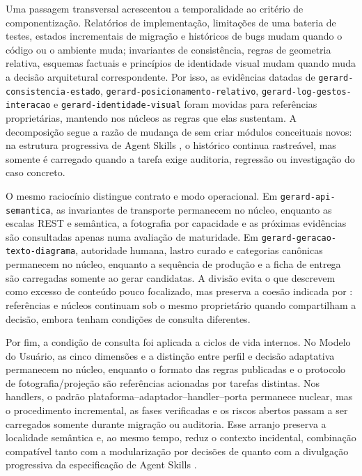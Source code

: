 \documentclass[preprint,12pt,authoryear]{elsarticle}
\begin{document}
Uma passagem transversal acrescentou a temporalidade ao critério de componentização. Relatórios de implementação, limitações de uma bateria de testes, estados incrementais de migração e históricos de bugs mudam quando o código ou o ambiente muda; invariantes de consistência, regras de geometria relativa, esquemas factuais e princípios de identidade visual mudam quando muda a decisão arquitetural correspondente. Por isso, as evidências datadas de \texttt{gerard-consistencia-estado}, \texttt{gerard-posicionamento-relativo}, \texttt{gerard-log-gestos-interacao} e \texttt{gerard-identidade-visual} foram movidas para referências proprietárias, mantendo nos núcleos as regras que elas sustentam. A decomposição segue a razão de mudança de \citet{parnas1972criteria} sem criar módulos conceituais novos: na estrutura progressiva de Agent Skills \citep{agentskills2026spec}, o histórico continua rastreável, mas somente é carregado quando a tarefa exige auditoria, regressão ou investigação do caso concreto.

O mesmo raciocínio distingue contrato e modo operacional. Em \texttt{gerard-api-semantica}, as invariantes de transporte permanecem no núcleo, enquanto as escalas REST e semântica, a fotografia por capacidade e as próximas evidências são consultadas apenas numa avaliação de maturidade. Em \texttt{gerard-geracao-texto-diagrama}, autoridade humana, lastro curado e categorias canônicas permanecem no núcleo, enquanto a sequência de produção e a ficha de entrega são carregadas somente ao gerar candidatas. A divisão evita o que \citet{hong2026smells} descrevem como excesso de conteúdo pouco focalizado, mas preserva a coesão indicada por \citet{parnas1972criteria}: referências e núcleos continuam sob o mesmo proprietário quando compartilham a decisão, embora tenham condições de consulta diferentes.

Por fim, a condição de consulta foi aplicada a ciclos de vida internos. No Modelo do Usuário, as cinco dimensões e a distinção entre perfil e decisão adaptativa permanecem no núcleo, enquanto o formato das regras publicadas e o protocolo de fotografia/projeção são referências acionadas por tarefas distintas. Nos handlers, o padrão plataforma--adaptador--handler--porta permanece nuclear, mas o procedimento incremental, as fases verificadas e os riscos abertos passam a ser carregados somente durante migração ou auditoria. Esse arranjo preserva a localidade semântica e, ao mesmo tempo, reduz o contexto incidental, combinação compatível tanto com a modularização por decisões de \citet{parnas1972criteria} quanto com a divulgação progressiva da especificação de Agent Skills \citep{agentskills2026spec}.
\end{document}
